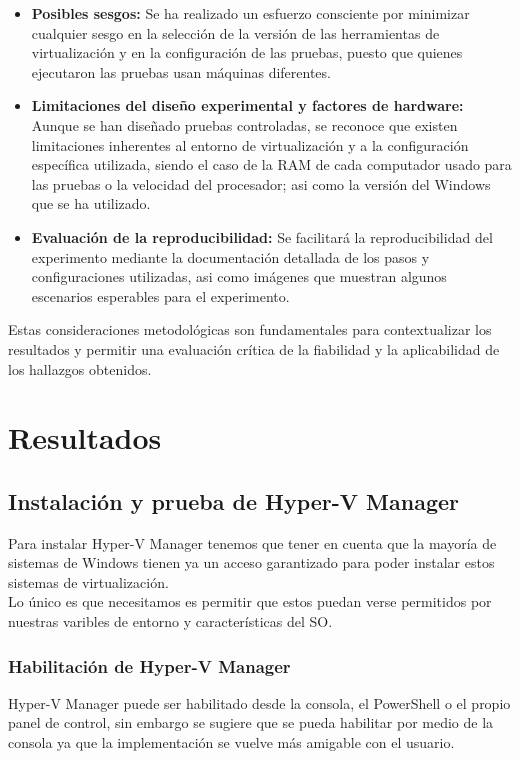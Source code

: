 \documentclass[journal]{IEEEtran}
\begin{document}
\begin{itemize}
    \item \textbf{Posibles sesgos:} Se ha realizado un esfuerzo consciente por minimizar cualquier sesgo en la selección de la versión de las herramientas de virtualización y en la configuración de las pruebas, puesto que quienes ejecutaron las pruebas usan máquinas diferentes.
    
    \item \textbf{Limitaciones del diseño experimental y factores de hardware:} Aunque se han diseñado pruebas controladas, se reconoce que existen limitaciones inherentes al entorno de virtualización y a la configuración específica utilizada, siendo el caso de la RAM de cada computador usado para las pruebas o la velocidad del procesador; asi como la versión del Windows que se ha utilizado.  
  
    \item \textbf{Evaluación de la reproducibilidad:} Se facilitará la reproducibilidad del experimento mediante la documentación detallada de los pasos y configuraciones utilizadas, asi como imágenes que muestran algunos escenarios esperables para el experimento.
\end{itemize}

Estas consideraciones metodológicas son fundamentales para contextualizar los resultados y permitir una evaluación crítica de la fiabilidad y la aplicabilidad de los hallazgos obtenidos.


\section{Resultados}

\subsection{Instalación y prueba de Hyper-V Manager}
Para instalar Hyper-V Manager tenemos que tener en cuenta que la mayoría de sistemas de Windows tienen ya un acceso garantizado para poder instalar estos sistemas de virtualización.\\
Lo único es que necesitamos es permitir que estos puedan verse permitidos por nuestras varibles de entorno y características del SO. \\
\subsubsection{Habilitación de Hyper-V Manager}
Hyper-V Manager puede ser habilitado desde la consola, el PowerShell o el propio panel de control\cite{Wlear2024}, sin embargo se sugiere que se pueda habilitar por medio de la consola ya que la implementación se vuelve más amigable con el usuario.\\
\end{document}
